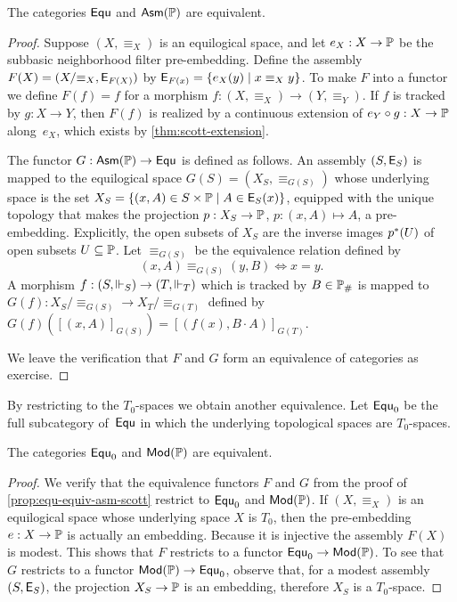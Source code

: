 \begin{proposition}
  \label{prop:equ-equiv-asm-scott}%
  The categories $\mathsf{Equ}$ and $\mathsf{Asm}(\mathbb{P})$ are equivalent.
\end{proposition}

\begin{proof}
  Suppose $(X, {\equiv_X})$ is an equilogical space, and let $e_X : X
  \to \mathbb{P}$ be the subbasic neighborhood filter pre-embedding.
  Define the assembly $F(X) = (X/{\equiv_X}, \mathsf{E}_{F(X)})$ by
  $\mathsf{E}_{F(x)} = \{e_X(y) \mid x \equiv_X y\}$. To make $F$ into a
  functor we define $F(f) = f$ for a morphism $f : (X, {\equiv_X}) \to
  (Y, {\equiv_Y})$. If $f$ is tracked by $g : X \to Y$, then $F(f)$ is
  realized by a continuous extension of $e_Y \circ g : X \to \mathbb{P}$
  along~$e_X$, which exists by \cref{thm:scott-extension}.

  The functor $G : \mathsf{Asm}(\mathbb{P}) \to \mathsf{Equ}$ is defined as follows. An
  assembly $(S, \mathsf{E}_S)$ is mapped to the equilogical space $G(S) =
  (X_S, \equiv_{G(S)})$ whose underlying space is the set $X_S =
  \{(x,A) \in S \times \mathbb{P} \mid A \in \mathsf{E}_S(x)\}$, equipped with
  the unique topology that makes the projection $p : X_S \to \mathbb{P}$,
  $p : (x,A) \mapsto A$, a pre-embedding. Explicitly, the open subsets
  of $X_S$ are the inverse images $p^{*}(U)$ of open subsets $U
  \subseteq \mathbb{P}$. Let $\equiv_{G(S)}$ be the equivalence relation
  defined by
  \begin{equation*}
    (x,A) \equiv_{G(S)} (y,B) \iff x = y.
  \end{equation*}
  A morphism $f : (S, {\Vdash_S}) \to (T, {\Vdash_T})$ which is tracked by
  $B \in \mathbb{P}_{\#}$ is mapped to $G(f) : X_S/{\equiv_{G(S)}} \to
  X_T/{\equiv_{G(T)}}$ defined by $G(f)([(x,A)]_{G(S)}) = [(f(x), B
  \cdot A)]_{G(T)}$.

  We leave the verification that $F$ and $G$ form an equivalence of
  categories as exercise.
\end{proof}

By restricting to the $T_0$-spaces we obtain another equivalence. Let
$\mathsf{Equ}_0$ be the full subcategory of~$\mathsf{Equ}$ in which the underlying
topological spaces are $T_0$-spaces.


\begin{proposition}
  \label{prop:equ0-equiv-mod-scott}
  The categories $\mathsf{Equ}_0$ and $\mathsf{Mod}(\mathbb{P})$ are equivalent.
\end{proposition}

\begin{proof}
  We verify that the equivalence functors $F$ and $G$ from the proof
  of \cref{prop:equ-equiv-asm-scott} restrict to $\mathsf{Equ}_0$
  and $\mathsf{Mod}(\mathbb{P})$. If $(X, {\equiv_X})$ is an equilogical space
  whose underlying space $X$ is $T_0$, then the pre-embedding $e : X
  \to \mathbb{P}$ is actually an embedding. Because it is injective the
  assembly $F(X)$ is modest. This shows that $F$ restricts to a
  functor $\mathsf{Equ}_0 \to \mathsf{Mod}(\mathbb{P})$.
  To see that $G$ restricts to a functor $\mathsf{Mod}(\mathbb{P}) \to \mathsf{Equ}_0$,
  observe that, for a modest assembly $(S, \mathsf{E}_S)$, the projection
  $X_S \to \mathbb{P}$ is an embedding, therefore $X_S$ is a $T_0$-space.
\end{proof}

